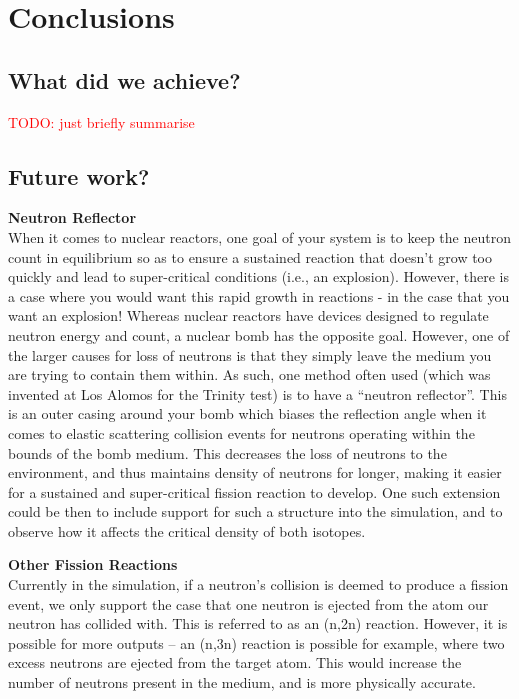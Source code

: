 \section{Conclusions}

\subsection{What did we achieve?}

\textcolor{red}{TODO: just briefly summarise}

\subsection{Future work?}


\textbf{Neutron Reflector} \\
When it comes to nuclear reactors, one goal of your system is to keep the neutron count in equilibrium so as to ensure a sustained 
reaction that doesn't grow too quickly and lead to super-critical conditions (i.e., an explosion). However, there is a case 
where you would want this rapid growth in reactions - in the case that you want an explosion! Whereas nuclear reactors have 
devices designed to regulate neutron energy and count, a nuclear bomb has the opposite goal. However, one of the larger 
causes for loss of neutrons is that they simply leave the medium you are trying to contain them within. As such, one 
method often used (which was invented at Los Alomos for the Trinity test) is to have a ``neutron reflector''. This is an 
outer casing around your bomb which biases the reflection angle when it comes to elastic scattering collision events for neutrons 
operating within the bounds of the bomb medium. This decreases the loss of neutrons to the environment, and thus maintains 
density of neutrons for longer, making it easier for a sustained and super-critical fission reaction to develop. One such extension 
could be then to include support for such a structure into the simulation, and to observe how it affects the critical density of both 
isotopes. 

\noindent\textbf{Other Fission Reactions} \\
Currently in the simulation, if a neutron's collision is deemed to produce a fission event, we only support the case that one neutron 
is ejected from the atom our neutron has collided with. This is referred to as an (n,2n) reaction. However, it is possible 
for more outputs -- an (n,3n) reaction is possible for example, where two excess neutrons are ejected from the target atom. This would 
increase the number of neutrons present in the medium, and is more physically accurate. 

